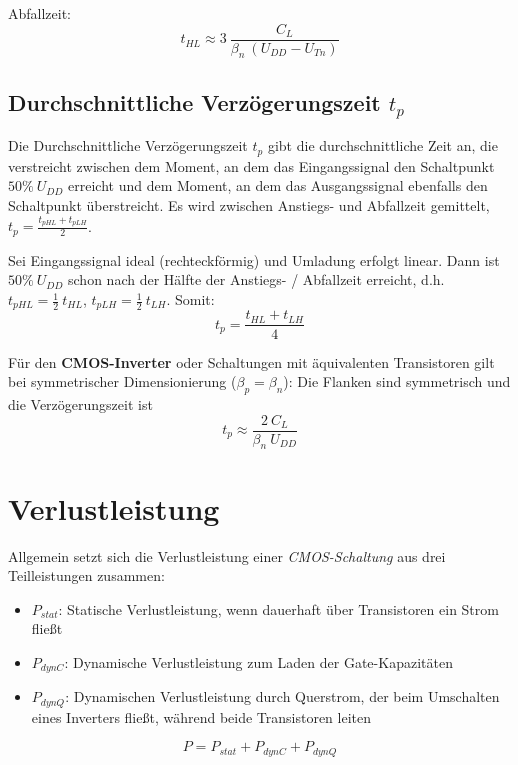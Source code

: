 \documentclass[a4paper,11pt]{article}
\begin{document}
Abfallzeit:
\[
	\boxed{ \quad t_{HL} \approx 3 ~ \frac{C_L}{\beta_n ~ (U_{DD} - U_{Tn})} \quad }
\]

\subsection*{Durchschnittliche Verzögerungszeit $t_p$}
Die Durchschnittliche Verzögerungszeit $t_p$ gibt die durchschnittliche Zeit an, die verstreicht zwischen dem Moment, an dem das Eingangssignal den Schaltpunkt $50 \% ~ U_{DD}$ erreicht und dem Moment, an dem das Ausgangssignal ebenfalls den Schaltpunkt überstreicht. Es wird zwischen Anstiegs- und Abfallzeit gemittelt, $t_p = \frac{t_{pHL} + t_{pLH}}{2}$.

Sei Eingangssignal ideal (rechteckförmig) und Umladung erfolgt linear. Dann ist $50 \% ~ U_{DD}$ schon nach der Hälfte der Anstiegs- / Abfallzeit erreicht, d.h. $t_{pHL} = \frac{1}{2} ~ t_{HL}$, $t_{pLH} = \frac{1}{2} ~ t_{LH}$. Somit:
\[
	t_p = \frac{t_{HL} + t_{LH}}{4}
\]

Für den \textbf{CMOS-Inverter} oder Schaltungen mit äquivalenten Transistoren gilt bei symmetrischer Dimensionierung ($\beta_p = \beta_n$): Die Flanken sind symmetrisch und die Verzögerungszeit ist
\[
	\boxed{ \quad t_p \approx \frac{2 ~ C_L}{\beta_n ~ U_{DD}} \quad }
\]

\newpage
\section*{Verlustleistung}
Allgemein setzt sich die Verlustleistung einer \textit{CMOS-Schaltung} aus drei Teilleistungen zusammen:
\begin{itemize}
\item $P_{stat}$: Statische Verlustleistung, wenn dauerhaft über Transistoren ein Strom fließt
\item $P_{dynC}$: Dynamische Verlustleistung zum Laden der Gate-Kapazitäten
\item $P_{dynQ}$: Dynamischen Verlustleistung durch Querstrom, der beim Umschalten eines Inverters fließt, während beide Transistoren leiten
\end{itemize}
\[ \boxed{P=P_{stat}+P_{dynC}+P_{dynQ}} \]
\end{document}
